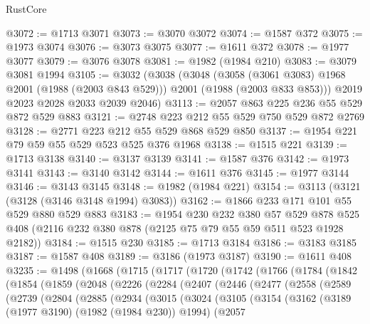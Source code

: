 \begin{lexlean}{RustCore}
\begin{coremodule}
@3072 := @1713 @3071
@3073 := @3070 @3072
@3074 := @1587 @372
@3075 := @1973 @3074
@3076 := @3073 @3075
@3077 := @1611 @372
@3078 := @1977 @3077
@3079 := @3076 @3078
@3081 := @1982 (@1984 @210)
@3083 := @3079 @3081 @1994
@3105 := @3032
    (@3038
      (@3048
        (@3058 (@3061 @3083) @1968 @2001 (@1988 (@2003 @843 @529)))
        @2001
        (@1988 (@2003 @833 @853)))
      @2019
      @2023
      @2028
      @2033
      @2039
      @2046)
@3113 := @2057 @863 @225 @236 @55 @529 @872 @529 @883
@3121 := @2748 @223 @212 @55 @529 @750 @529 @872 @2769
@3128 := @2771 @223 @212 @55 @529 @868 @529 @850
@3137 := @1954 @221 @79 @59 @55 @529 @523 @525 @376 @1968
@3138 := @1515 @221
@3139 := @1713 @3138
@3140 := @3137 @3139
@3141 := @1587 @376
@3142 := @1973 @3141
@3143 := @3140 @3142
@3144 := @1611 @376
@3145 := @1977 @3144
@3146 := @3143 @3145
@3148 := @1982 (@1984 @221)
@3154 := @3113 (@3121 (@3128 (@3146 @3148 @1994) @3083))
@3162 := @1866 @233 @171 @101 @55 @529 @880 @529 @883
@3183 := @1954
    @230
    @232
    @380
    @57
    @529
    @878
    @525
    @408
    (@2116 @232 @380 @878 (@2125 @75 @79 @55 @59 @511 @523 @1928 @2182))
@3184 := @1515 @230
@3185 := @1713 @3184
@3186 := @3183 @3185
@3187 := @1587 @408
@3189 := @3186 (@1973 @3187)
@3190 := @1611 @408
@3235 := @1498
    (@1668
      (@1715
        (@1717
          (@1720
            (@1742
              (@1766
                (@1784
                  (@1842
                    (@1854
                      (@1859
                        (@2048
                          (@2226
                            (@2284
                              (@2407
                                (@2446
                                  (@2477
                                    (@2558
                                      (@2589
                                        (@2739
                                          (@2804
                                            (@2885
                                              (@2934
                                                (@3015
                                                  (@3024
                                                    (@3105
                                                      (@3154
                                                        (@3162
                                                          (@3189
                                                            (@1977 @3190)
                                                            (@1982 (@1984 @230))
                                                            @1994)
                                                          (@2057

\end{coremodule}
\end{lexlean}

